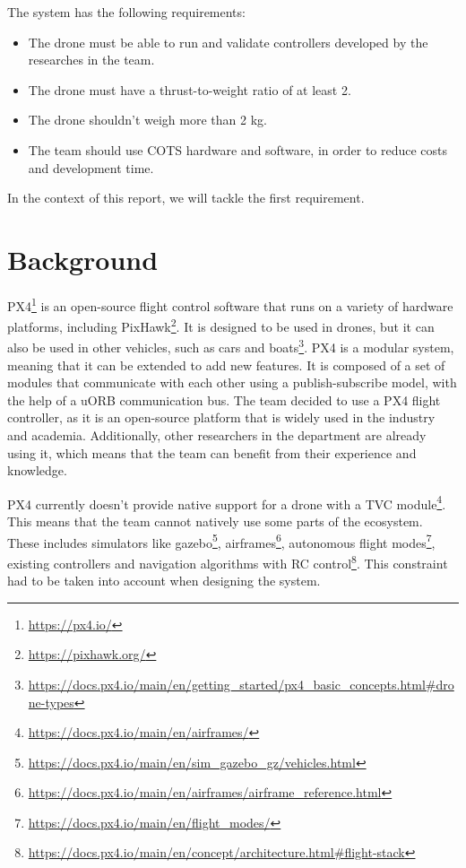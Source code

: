 \documentclass[a4paper]{article}
\begin{document}
The system has the following requirements: 
\begin{itemize}
    \item The drone must be able to run and validate controllers developed by the researches in the team. 
    \item The drone must have a thrust-to-weight ratio of at least 2. 
    \item The drone shouldn't weigh more than 2 kg. 
    \item The team should use COTS hardware and software, in order to reduce costs and development time. 
\end{itemize}

In the context of this report, we will tackle the first requirement. 



\clearpage
\label{sec::background}
\section{Background}

PX4\footnote{\url{https://px4.io/}} is an open-source flight control software that runs on a variety of hardware platforms, including PixHawk\footnote{\url{https://pixhawk.org/}}.
It is designed to be used in drones, but it can also be used in other vehicles, such as cars and boats\footnote{\url{https://docs.px4.io/main/en/getting_started/px4_basic_concepts.html\#drone-types}}.
PX4 is a modular system, meaning that it can be extended to add new features.
It is composed of a set of modules that communicate with each other using a publish-subscribe model, with the help of a uORB communication bus. 
The team decided to use a PX4 flight controller, as it is an open-source platform that is widely used in the industry and academia. 
Additionally, other researchers in the department are already using it, which means that the team can benefit from their experience and knowledge. 

PX4 currently doesn't provide native support for a drone with a TVC module\footnote{\url{https://docs.px4.io/main/en/airframes/}}. This means that the team cannot natively use some parts of the ecosystem. 
These includes simulators like gazebo\footnote{\url{https://docs.px4.io/main/en/sim_gazebo_gz/vehicles.html}}, airframes\footnote{\url{https://docs.px4.io/main/en/airframes/airframe_reference.html}}, autonomous flight modes\footnote{\url{https://docs.px4.io/main/en/flight_modes/}}, existing controllers and navigation algorithms with RC control\footnote{\url{https://docs.px4.io/main/en/concept/architecture.html\#flight-stack}}. 
This constraint had to be taken into account when designing the system. 
\end{document}
